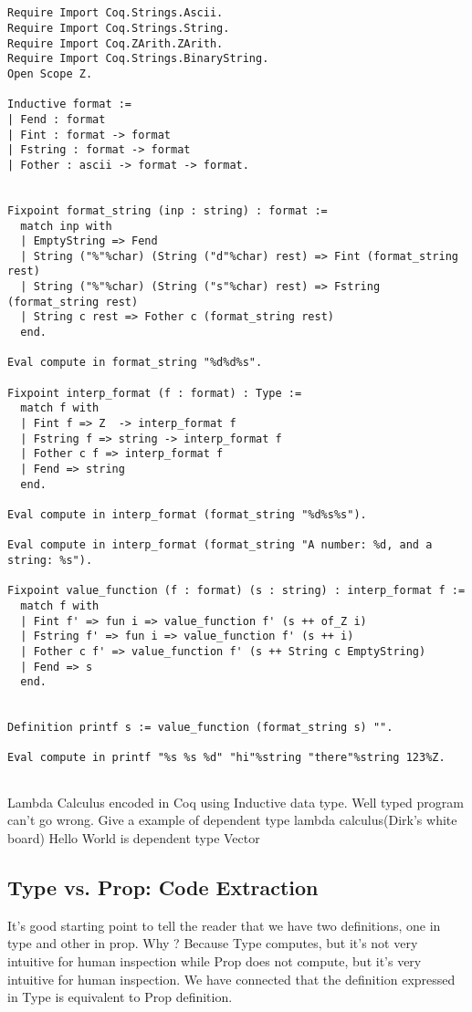   
  \begin{verbatim}
  
  
Require Import Coq.Strings.Ascii.
Require Import Coq.Strings.String.
Require Import Coq.ZArith.ZArith.
Require Import Coq.Strings.BinaryString.
Open Scope Z.

Inductive format :=
| Fend : format
| Fint : format -> format
| Fstring : format -> format
| Fother : ascii -> format -> format.


Fixpoint format_string (inp : string) : format :=
  match inp with
  | EmptyString => Fend
  | String ("%"%char) (String ("d"%char) rest) => Fint (format_string rest)
  | String ("%"%char) (String ("s"%char) rest) => Fstring (format_string rest)
  | String c rest => Fother c (format_string rest)
  end.

Eval compute in format_string "%d%d%s".

Fixpoint interp_format (f : format) : Type :=
  match f with
  | Fint f => Z  -> interp_format f
  | Fstring f => string -> interp_format f
  | Fother c f => interp_format f
  | Fend => string
  end.

Eval compute in interp_format (format_string "%d%s%s").

Eval compute in interp_format (format_string "A number: %d, and a string: %s").

Fixpoint value_function (f : format) (s : string) : interp_format f :=
  match f with
  | Fint f' => fun i => value_function f' (s ++ of_Z i)
  | Fstring f' => fun i => value_function f' (s ++ i)
  | Fother c f' => value_function f' (s ++ String c EmptyString)
  | Fend => s
  end.


Definition printf s := value_function (format_string s) "".

Eval compute in printf "%s %s %d" "hi"%string "there"%string 123%Z.
                                        
\end{verbatim}
  
  
  
     Lambda Calculus encoded in Coq using Inductive data type. 
  Well typed program can't go wrong. 
  Give a example of dependent type lambda calculus(Dirk's white board)
  Hello World is dependent type Vector 
\subsection{Type vs. Prop: Code Extraction}
\label{sec:typeprop}
  It's good starting point to tell the reader that we have two definitions, 
  one in type and other in prop. Why ? Because Type computes, but it's
  not very intuitive for human inspection while Prop does not compute, 
  but it's very intuitive for human inspection. We have connected that 
  the definition expressed in Type is equivalent to Prop definition. 
 
